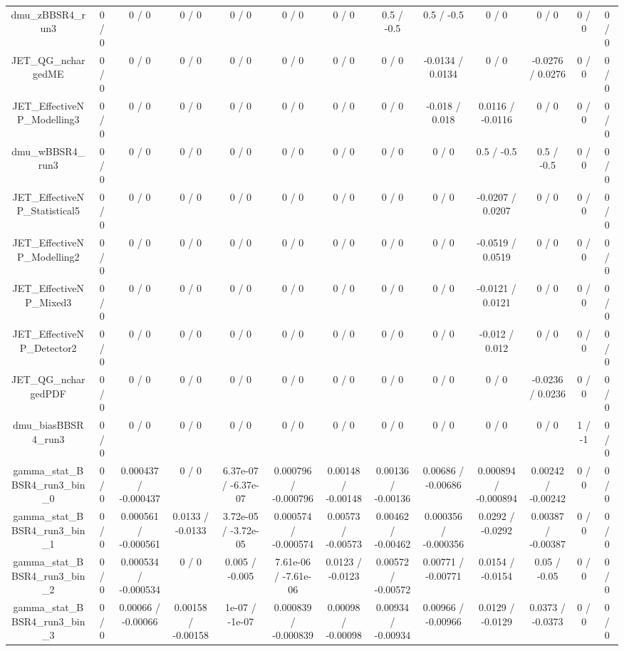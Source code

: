 \documentclass[10pt]{article}
\begin{document}
\begin{table}[htbp]
\begin{center}
\begin{tabular}{|c|c|c|c|c|c|c|c|c|c|c|c|c|}
  dmu_zBBSR4_run3 & 0 / 0 & 0 / 0 & 0 / 0 & 0 / 0 & 0 / 0 & 0 / 0 & 0.5 / -0.5 & 0.5 / -0.5 & 0 / 0 & 0 / 0 & 0 / 0 & 0 / 0 \\ 
  JET_QG_nchargedME & 0 / 0 & 0 / 0 & 0 / 0 & 0 / 0 & 0 / 0 & 0 / 0 & 0 / 0 & -0.0134 / 0.0134 & 0 / 0 & -0.0276 / 0.0276 & 0 / 0 & 0 / 0 \\ 
  JET_EffectiveNP_Modelling3 & 0 / 0 & 0 / 0 & 0 / 0 & 0 / 0 & 0 / 0 & 0 / 0 & 0 / 0 & -0.018 / 0.018 & 0.0116 / -0.0116 & 0 / 0 & 0 / 0 & 0 / 0 \\ 
  dmu_wBBSR4_run3 & 0 / 0 & 0 / 0 & 0 / 0 & 0 / 0 & 0 / 0 & 0 / 0 & 0 / 0 & 0 / 0 & 0.5 / -0.5 & 0.5 / -0.5 & 0 / 0 & 0 / 0 \\ 
  JET_EffectiveNP_Statistical5 & 0 / 0 & 0 / 0 & 0 / 0 & 0 / 0 & 0 / 0 & 0 / 0 & 0 / 0 & 0 / 0 & -0.0207 / 0.0207 & 0 / 0 & 0 / 0 & 0 / 0 \\ 
  JET_EffectiveNP_Modelling2 & 0 / 0 & 0 / 0 & 0 / 0 & 0 / 0 & 0 / 0 & 0 / 0 & 0 / 0 & 0 / 0 & -0.0519 / 0.0519 & 0 / 0 & 0 / 0 & 0 / 0 \\ 
  JET_EffectiveNP_Mixed3 & 0 / 0 & 0 / 0 & 0 / 0 & 0 / 0 & 0 / 0 & 0 / 0 & 0 / 0 & 0 / 0 & -0.0121 / 0.0121 & 0 / 0 & 0 / 0 & 0 / 0 \\ 
  JET_EffectiveNP_Detector2 & 0 / 0 & 0 / 0 & 0 / 0 & 0 / 0 & 0 / 0 & 0 / 0 & 0 / 0 & 0 / 0 & -0.012 / 0.012 & 0 / 0 & 0 / 0 & 0 / 0 \\ 
  JET_QG_nchargedPDF & 0 / 0 & 0 / 0 & 0 / 0 & 0 / 0 & 0 / 0 & 0 / 0 & 0 / 0 & 0 / 0 & 0 / 0 & -0.0236 / 0.0236 & 0 / 0 & 0 / 0 \\ 
  dmu_biasBBSR4_run3 & 0 / 0 & 0 / 0 & 0 / 0 & 0 / 0 & 0 / 0 & 0 / 0 & 0 / 0 & 0 / 0 & 0 / 0 & 0 / 0 & 1 / -1 & 0 / 0 \\ 
  gamma_stat_BBSR4_run3_bin_0 & 0 / 0 & 0.000437 / -0.000437 & 0 / 0 & 6.37e-07 / -6.37e-07 & 0.000796 / -0.000796 & 0.00148 / -0.00148 & 0.00136 / -0.00136 & 0.00686 / -0.00686 & 0.000894 / -0.000894 & 0.00242 / -0.00242 & 0 / 0 & 0 / 0 \\ 
  gamma_stat_BBSR4_run3_bin_1 & 0 / 0 & 0.000561 / -0.000561 & 0.0133 / -0.0133 & 3.72e-05 / -3.72e-05 & 0.000574 / -0.000574 & 0.00573 / -0.00573 & 0.00462 / -0.00462 & 0.000356 / -0.000356 & 0.0292 / -0.0292 & 0.00387 / -0.00387 & 0 / 0 & 0 / 0 \\ 
  gamma_stat_BBSR4_run3_bin_2 & 0 / 0 & 0.000534 / -0.000534 & 0 / 0 & 0.005 / -0.005 & 7.61e-06 / -7.61e-06 & 0.0123 / -0.0123 & 0.00572 / -0.00572 & 0.00771 / -0.00771 & 0.0154 / -0.0154 & 0.05 / -0.05 & 0 / 0 & 0 / 0 \\ 
  gamma_stat_BBSR4_run3_bin_3 & 0 / 0 & 0.00066 / -0.00066 & 0.00158 / -0.00158 & 1e-07 / -1e-07 & 0.000839 / -0.000839 & 0.00098 / -0.00098 & 0.00934 / -0.00934 & 0.00966 / -0.00966 & 0.0129 / -0.0129 & 0.0373 / -0.0373 & 0 / 0 & 0 / 0 \\ 

\end{tabular}
\end{center}
\end{table}
\end{document}
